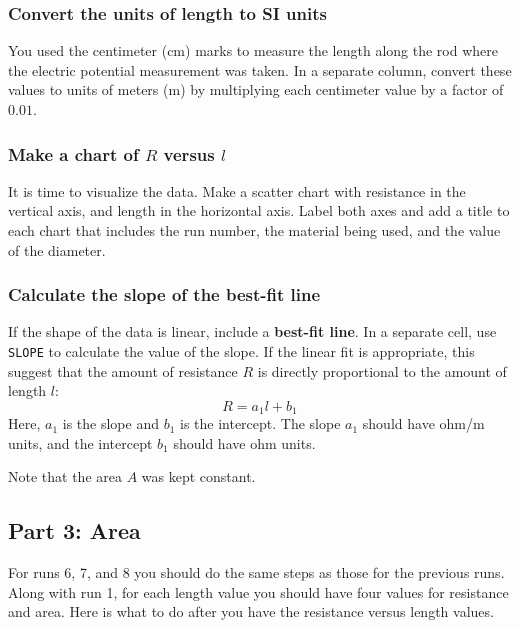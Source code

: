 \subsubsection{Convert the units of length to SI units}
You used the centimeter (cm) marks to measure the length along the rod where the electric potential measurement was taken. In a separate column, convert these values to units of meters (m) by multiplying each centimeter value by a factor of $0.01$.
\subsubsection{Make a chart of $R$ versus $l$}
It is time to visualize the data. Make a scatter chart with resistance in the vertical axis, and length in the horizontal axis. Label both axes and add a title to each chart that includes the run number, the material being used, and the value of the diameter.
\subsubsection{Calculate the slope of the best-fit line}
If the shape of the data is linear, include a \textbf{best-fit line}. In a separate cell, use \texttt{SLOPE} to calculate the value of the slope. If the linear fit is appropriate, this suggest that the amount of resistance $R$ is directly proportional to the amount of length $l$:
\begin{equation}
	R = a_{1} l + b_{1}
\end{equation}
Here, $a_{1}$ is the slope and $b_{1}$ is the intercept. The slope $a_{1}$ should have ohm/m units, and the intercept $b_{1}$ should have ohm units.

Note that the area $A$ was kept constant.
\subsection{Part 3: Area}
For runs 6, 7, and 8 you should do the same steps as those for the previous runs. Along with run 1, for each length value you should have four values for resistance and area. Here is what to do after you have the resistance versus length values.
